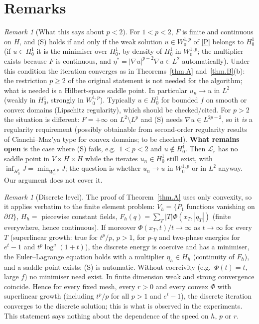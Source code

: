 \documentclass[11pt]{amsart}
\theoremstyle{remark}
\newtheorem{remark}[teo]{Remark}
\theoremstyle{definition}
\begin{document}
\section{Remarks}
\begin{remark}[What this says about $p<2$]
For $1<p<2$, $F$ is finite and continuous on $H$, and (S) holds if and only if the weak solution $u\in W^{1,p}_0$ of \eqref{P} belongs to $H^1_0$ (if $u\in H^1_0$ it is the minimiser over $H^1_0$, by density of $H^1_0$ in $W^{1,p}_0$; the multiplier exists because $F$ is continuous, and $\eta^*=|\nabla u|^{p-2}\nabla u\in L^2$ automatically). Under this condition the iteration converges as in Theorems~\ref{thm.A} and~\ref{thm.B}(b): the restriction $p\ge2$ of the original statement is not needed for the algorithm; what is needed is a Hilbert-space saddle point. In particular $u_n\to u$ in $L^2$ (weakly in $H^1_0$, strongly in $W^{1,p}_0$). Typically $u\in H^1_0$ for bounded $f$ on smooth or convex domains (Lipschitz regularity), which should be checked/cited. For $p>2$ the situation is different: $F=+\infty$ on $L^2\setminus L^p$ and (S) needs $\nabla u\in L^{2p-2}$, so it \emph{is} a regularity requirement (possibly obtainable from second-order regularity results of Cianchi--Maz'ya type for convex domains; to be checked).
\textbf{What remains open} is the case where (S) fails, e.g.\ $1<p<2$ and $u\notin H^1_0$. Then $\mathcal L_r$ has no saddle point in $V\times H\times H$ while the iterates $u_n\in H^1_0$ still exist, with $\inf_{H^1_0}J=\min_{W^{1,p}_0}J$; the question is whether $u_n\to u$ in $W^{1,p}_0$ or in $L^2$ anyway. Our argument does not cover it.
\end{remark}
\begin{remark}[Discrete level]
The proof of Theorem~\ref{thm.A} uses only convexity, so it applies verbatim to the finite element problem: $V_h=\{P_1$ functions vanishing on $\partial\Omega\}$, $H_h=$ piecewise constant fields, $F_h(q)=\sum_T|T|\Phi(x_T,|q_T|)$ (finite everywhere, hence continuous). If moreover $\Phi(x_T,t)/t\to\infty$ as $t\to\infty$ for every $T$ (superlinear growth: true for $t^p/p$, $p>1$, for $p$-$q$ and two-phase energies for $e^t-1$ and $t^p\log^a(1+t)$), the discrete energy is coercive and has a minimiser, the Euler--Lagrange equation holds with a multiplier $\eta_h\in H_h$ (continuity of $F_h$), and a saddle point exists: (S) is automatic. Without coercivity (e.g.\ $\Phi(t)=t$, large $f$) no minimiser need exist. In finite dimension weak and strong convergence coincide. Hence for every fixed mesh, every $r>0$ and every convex $\Phi$ with superlinear growth (including $t^p/p$ for all $p>1$ and $e^t-1$), the discrete iteration converges to the discrete solution; this is what is observed in the experiments. This statement says nothing about the dependence of the speed on $h$, $p$ or $r$.
\end{remark}
\end{document}
